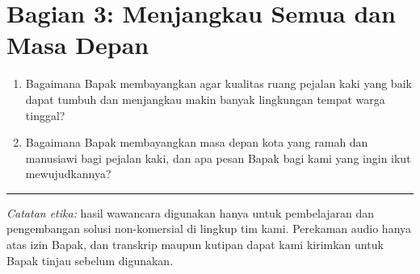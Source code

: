 \documentclass[11pt,a4paper]{article}
\begin{document}
\section*{Bagian 3: Menjangkau Semua dan Masa Depan}
\begin{enumerate}[label=\arabic*., itemsep=6pt, leftmargin=*, start=6]
  \item Bagaimana Bapak membayangkan agar kualitas ruang pejalan kaki yang baik dapat tumbuh dan
        menjangkau makin banyak lingkungan tempat warga tinggal?
  \item Bagaimana Bapak membayangkan masa depan kota yang ramah dan manusiawi bagi pejalan kaki,
        dan apa pesan Bapak bagi kami yang ingin ikut mewujudkannya?
\end{enumerate}

\vspace{10pt}
\hrule
\vspace{8pt}
\noindent\small\textit{Catatan etika:} hasil wawancara digunakan hanya untuk pembelajaran dan
pengembangan solusi non-komersial di lingkup tim kami. Perekaman audio hanya atas izin Bapak, dan
transkrip maupun kutipan dapat kami kirimkan untuk Bapak tinjau sebelum digunakan.
\end{document}
